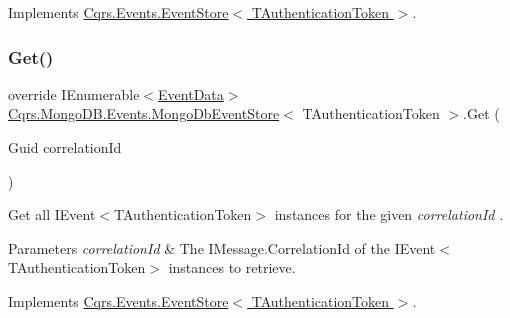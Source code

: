 Implements \hyperlink{classCqrs_1_1Events_1_1EventStore_aa1d0d399a35c1e3b0759e27202695d8b_aa1d0d399a35c1e3b0759e27202695d8b}{Cqrs.\+Events.\+Event\+Store$<$ T\+Authentication\+Token $>$}.

\mbox{\label{classCqrs_1_1MongoDB_1_1Events_1_1MongoDbEventStore_ac886ca0a57ad86cb99ef0a3767db9280_ac886ca0a57ad86cb99ef0a3767db9280}} 
\subsubsection{\texorpdfstring{Get()}{Get()}\hspace{0.1cm}{\footnotesize\ttfamily [2/2]}}
{\footnotesize\ttfamily override I\+Enumerable$<$\hyperlink{classCqrs_1_1Events_1_1EventData}{Event\+Data}$>$ \hyperlink{classCqrs_1_1MongoDB_1_1Events_1_1MongoDbEventStore}{Cqrs.\+Mongo\+D\+B.\+Events.\+Mongo\+Db\+Event\+Store}$<$ T\+Authentication\+Token $>$.Get (\begin{DoxyParamCaption}\item[{Guid}]{correlation\+Id }\end{DoxyParamCaption})\hspace{0.3cm}{\ttfamily [virtual]}}



Get all I\+Event$<$\+T\+Authentication\+Token$>$ instances for the given {\itshape correlation\+Id} . 


\begin{DoxyParams}{Parameters}
{\em correlation\+Id} & The I\+Message.\+Correlation\+Id of the I\+Event$<$\+T\+Authentication\+Token$>$ instances to retrieve.\\
\hline
\end{DoxyParams}


Implements \hyperlink{classCqrs_1_1Events_1_1EventStore_a0096646f5dff730b0041b9469719c420_a0096646f5dff730b0041b9469719c420}{Cqrs.\+Events.\+Event\+Store$<$ T\+Authentication\+Token $>$}.

\mbox{\label{classCqrs_1_1MongoDB_1_1Events_1_1MongoDbEventStore_aa6a9499aa1dcde55d82d8e0f3b5bd077_aa6a9499aa1dcde55d82d8e0f3b5bd077}} 
